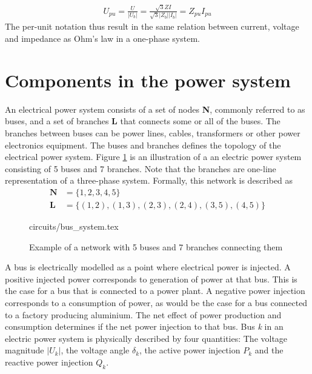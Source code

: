 \documentclass[class=book, crop=false]{standalone}
\begin{document}
\begin{equation}
   \begin{aligned}\label{eq:theory:per_unit_impedance_ohm}
U_{pu} = \frac{U}{|U_{b}|}
        = \frac{\sqrt{3}ZI}{\sqrt{3}|Z_{b}||I_{b}|}
        = Z_{pu}I_{pu}
\end{aligned} 
\end{equation}
The per-unit notation thus result in the same relation between current, voltage and impedance as Ohm's law in a one-phase system. 

\section{Components in the power system}
An electrical power system consists of a set of nodes \textbf{N}, commonly referred to as buses, and a set of branches \textbf{L} that connects some or all of the buses. The branches between buses can be power lines, cables, transformers or other power electronics equipment. The buses and branches defines the topology of the electrical power system. Figure \ref{fig:theory:bus_system} is an illustration of a an electric power system consisting of 5 buses and 7 branches. Note that the branches are one-line representation of a three-phase system. Formally, this network is described as 
\begin{equation}
   \begin{aligned}\label{eq:theory:network_set}
\textbf{N} &= \{1,2,3,4,5\}\\
\textbf{L} &= \{(1,2),(1,3),(2,3),(2,4),(3,5),(4,5)\}
\end{aligned} 
\end{equation}



\begin{figure}[ht!]
    \center
    {circuits/bus_system.tex}
    \caption[size = 9]
    {Example of a network with 5 buses and 7 branches connecting them}\label{fig:theory:bus_system}
\end{figure}
A bus is electrically modelled as a point where electrical power is injected. A positive injected power corresponds to generation of power at that bus. This is the case for a bus that is connected to a power plant. A negative power injection corresponds to a consumption of power, as would be the case for a bus connected to a factory producing aluminium. The net effect of power production and consumption determines if the net power injection to that bus. Bus \textit{k} in an electric power system is physically described by four quantities: The voltage magnitude $|U_{k}|$, the voltage angle $\delta_{k}$, the active power injection $P_{k}$ and the reactive power injection $Q_{k}$.
\end{document}
